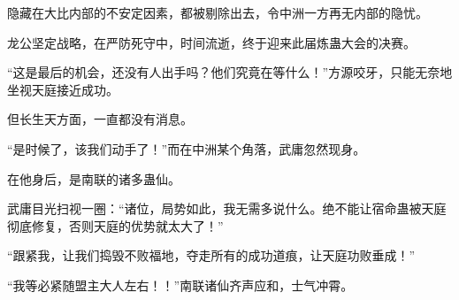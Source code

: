 \begin{this_body}
隐藏在大比内部的不安定因素，都被剔除出去，令中洲一方再无内部的隐忧。

龙公坚定战略，在严防死守中，时间流逝，终于迎来此届炼蛊大会的决赛。

“这是最后的机会，还没有人出手吗？他们究竟在等什么！”方源咬牙，只能无奈地坐视天庭接近成功。

但长生天方面，一直都没有消息。

“是时候了，该我们动手了！”而在中洲某个角落，武庸忽然现身。

在他身后，是南联的诸多蛊仙。

武庸目光扫视一圈：“诸位，局势如此，我无需多说什么。绝不能让宿命蛊被天庭彻底修复，否则天庭的优势就太大了！”

“跟紧我，让我们捣毁不败福地，夺走所有的成功道痕，让天庭功败垂成！”

“我等必紧随盟主大人左右！！”南联诸仙齐声应和，士气冲霄。

\end{this_body}


